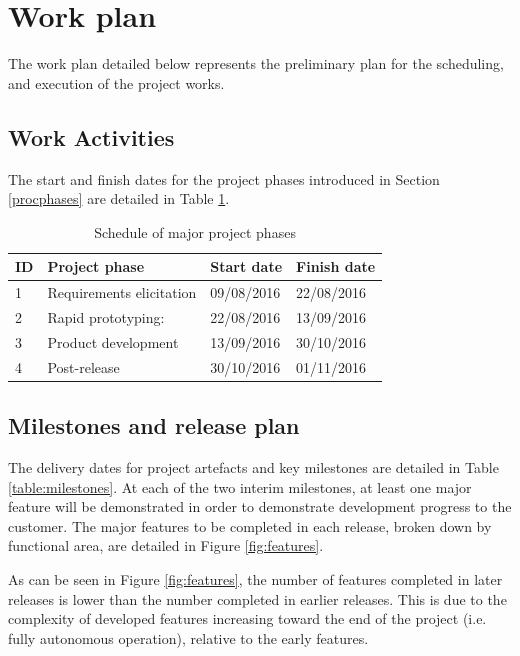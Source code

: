 \documentclass[12pt]{article}
\begin{document}
\section{Work plan}
The work plan detailed below represents the preliminary plan for the scheduling, and execution of the project works.

\subsection{Work Activities}\label{schedule}

The start and finish dates for the project phases introduced in Section \ref{procphases} are detailed in Table \ref{table:schedule}.

\begin{table}
\begin{tabular}{ | p{} | p{}| p{} |p{}|}
\hline
\textbf \textbf{ID } &  \textbf\textbf{ Project phase } &  \textbf\textbf {Start date } & \textbf\textbf{Finish date } \\
\hline
1 & Requirements elicitation & 09/08/2016 & 22/08/2016 \\
\hline
2 & Rapid prototyping: & 22/08/2016 & 13/09/2016 \\
\hline
3 & Product development & 13/09/2016 & 30/10/2016 \\
\hline
4 & Post-release & 30/10/2016 & 01/11/2016  \\
\hline
\end{tabular}
\caption{Schedule of major project phases}
\label{table:schedule}
\end{table} 

\subsection{Milestones and release plan}\label{milestones}
The delivery dates for project artefacts and key milestones are detailed in Table \ref{table:milestones}. At each of the two interim milestones, at least one major feature will be demonstrated in order to demonstrate development progress to  the customer. The major features to be completed in each release, broken down by functional area, are detailed in Figure \ref{fig:features}.

As can be seen in Figure \ref{fig:features}, the number of features completed in later releases is lower than the number completed in earlier releases. This is due to the complexity of developed features increasing toward the end of the project (i.e. fully autonomous operation), relative to the early features.
\end{document}
